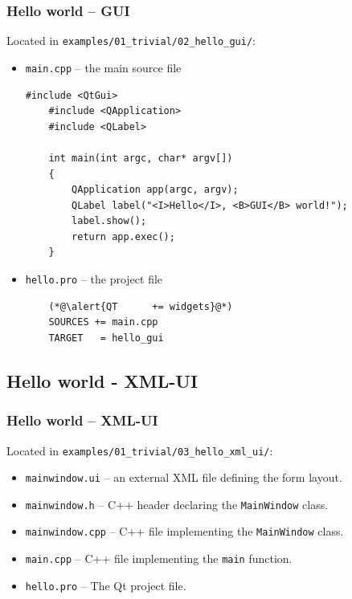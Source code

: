 \begin{frame}[fragile]
  \frametitle{Hello world -- GUI}
  Located in \texttt{examples/01\_trivial/02\_hello\_gui/}:
  \begin{itemize}
  \item \texttt{main.cpp} -- the main source file
  \begin{lstlisting}[basicstyle=\scriptsize\ttfamily]
	#include <QtGui>
	#include <QApplication>
	#include <QLabel>

	int main(int argc, char* argv[])
	{
	    QApplication app(argc, argv);
	    QLabel label("<I>Hello</I>, <B>GUI</B> world!");
	    label.show();
	    return app.exec();
	}\end{lstlisting}
  \item \texttt{hello.pro} -- the project file
  \begin{lstlisting}
	(*@\alert{QT      += widgets}@*)
	SOURCES += main.cpp
	TARGET   = hello_gui
  \end{lstlisting}
  \end{itemize}
\end{frame}

\subsection{Hello world - XML-UI}

\begin{frame}
  \frametitle{Hello world -- XML-UI}
  Located in \texttt{examples/01\_trivial/03\_hello\_xml\_ui/}:

  \begin{itemize}
  \item \texttt{mainwindow.ui} -- an external XML file defining the form layout.
  \item \texttt{mainwindow.h} -- C++ header declaring the \texttt{MainWindow} class.
  \item \texttt{mainwindow.cpp} -- C++ file implementing the \texttt{MainWindow} class.
  \item \texttt{main.cpp} -- C++ file implementing the \texttt{main} function.
  \item \texttt{hello.pro} -- The Qt project file.
  \end{itemize}
\end{frame}

